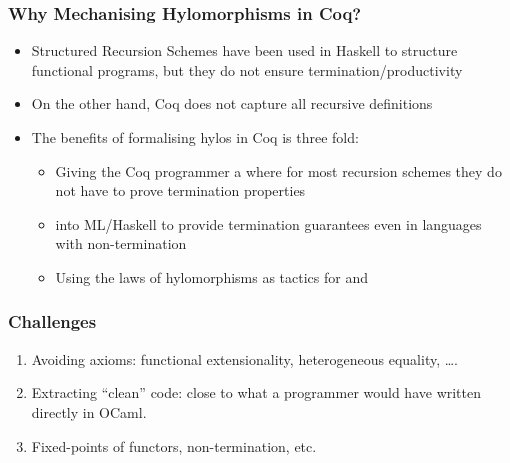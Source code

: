 \begin{frame}
  \frametitle{Why Mechanising Hylomorphisms in Coq?}

  \begin{itemize}
    \item Structured Recursion Schemes have been used in Haskell to structure
      functional programs, but they do not ensure termination/productivity
    \item On the other hand, Coq does not capture all recursive definitions
    \item The benefits of formalising hylos in Coq is three fold:
      \begin{itemize}
        \item Giving the Coq programmer a  where for most
          recursion schemes they do not have to prove termination properties
        \item {} into ML/Haskell to provide termination
          guarantees even in languages with non-termination
        \item Using the laws of hylomorphisms as tactics for  and 
      \end{itemize}
  \end{itemize}
\end{frame}

\begin{frame}
  \frametitle{Challenges}
  \begin{enumerate}
    \item Avoiding axioms: functional extensionality, heterogeneous equality,
      \ldots.
    \item Extracting ``clean'' code: close to what a programmer would have
      written directly in OCaml.
    \item Fixed-points of functors, non-termination, etc.
  \end{enumerate}

  \vspace{.5cm}
  

\end{frame}


